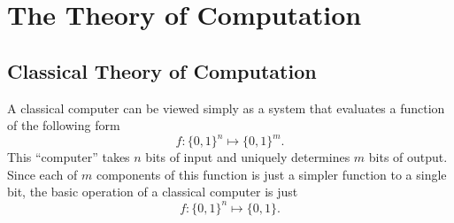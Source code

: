 
\section{The Theory of Computation}


\subsection{Classical Theory of Computation}

A classical computer can be viewed simply as a
system that evaluates a function of the following
form
\begin{equation}
f\colon\lbrace 0,1\rbrace^n \mapsto \lbrace 0,1\rbrace^m.
\end{equation}
This ``computer'' takes $n$ bits of input and uniquely
determines $m$ bits of output.
Since each of $m$ components of this function is just a 
simpler function to a single bit,
the basic operation of a classical computer is just 
\begin{equation}
f\colon\lbrace 0,1\rbrace^n \mapsto \lbrace 0,1\rbrace.
\end{equation}


